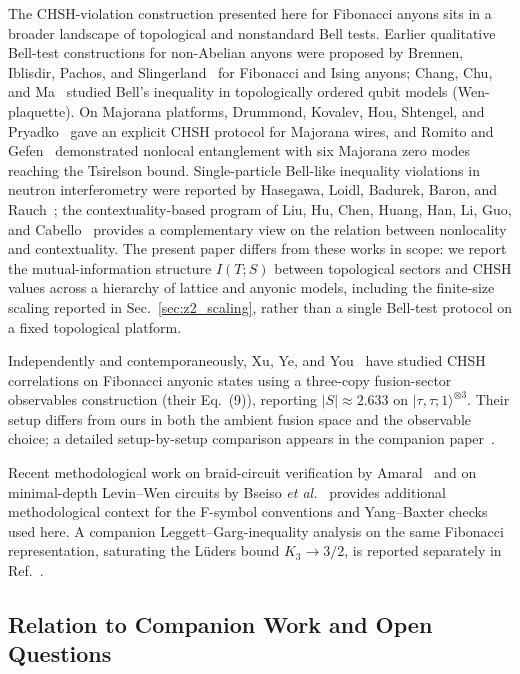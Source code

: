\documentclass[aps,pra,twocolumn,superscriptaddress,showpacs,floatfix]{revtex4-2}
\begin{document}
The CHSH-violation construction presented here for Fibonacci anyons sits in
a broader landscape of topological and nonstandard Bell tests. Earlier
qualitative Bell-test constructions for non-Abelian anyons were proposed by
Brennen, Iblisdir, Pachos, and Slingerland~\cite{Brennen2009} for Fibonacci
and Ising anyons; Chang, Chu, and Ma~\cite{ChangChuMa2017} studied Bell's
inequality in topologically ordered qubit models (Wen-plaquette). On Majorana
platforms, Drummond, Kovalev, Hou, Shtengel, and Pryadko~\cite{Drummond2014}
gave an explicit CHSH protocol for Majorana wires, and Romito and
Gefen~\cite{RomitoGefen2017} demonstrated nonlocal entanglement with six
Majorana zero modes reaching the Tsirelson bound. Single-particle Bell-like
inequality violations in neutron interferometry were reported by
Hasegawa, Loidl, Badurek, Baron, and
Rauch~\cite{Hasegawa2003}; the contextuality-based program of
Liu, Hu, Chen, Huang, Han, Li, Guo, and
Cabello~\cite{Liu2016Cabello} provides a complementary view on the relation
between nonlocality and contextuality. The present paper differs from these
works in scope: we report the mutual-information structure $I(T;S)$ between
topological sectors and CHSH values across a hierarchy of lattice and anyonic
models, including the finite-size scaling reported in
Sec.~\ref{sec:z2_scaling}, rather than a single Bell-test protocol on a fixed
topological platform.

Independently and contemporaneously, Xu, Ye, and You~\cite{Xu2025} have
studied CHSH correlations on Fibonacci anyonic states using a three-copy
fusion-sector observables construction (their Eq.~(9)), reporting
$|S| \approx 2.633$ on $|\tau,\tau;1\rangle^{\otimes 3}$. Their setup differs
from ours in both the ambient fusion space and the observable choice; a
detailed setup-by-setup comparison appears in the companion
paper~\cite{Sayim2026fibonacci}.

Recent methodological work on braid-circuit verification by
Amaral~\cite{Amaral2025} and on minimal-depth Levin--Wen circuits by
Bseiso \emph{et al.}~\cite{Bseiso2024} provides additional methodological
context for the F-symbol conventions and Yang--Baxter checks used here. A
companion Leggett--Garg-inequality analysis on the same Fibonacci representation,
saturating the L\"uders bound $K_3 \to 3/2$, is reported separately in
Ref.~\cite{Sayim2026LGI}.

\subsection{Relation to Companion Work and Open Questions}
\end{document}
